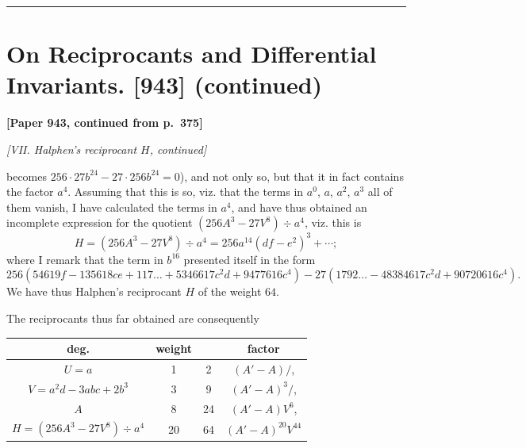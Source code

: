 \documentclass[11pt,a4paper]{book}
\begin{document}
{{{\vspace{1cm}
\begin{center}
\rule{0.5\textwidth}{0.4pt}
\end{center}
\clearpage


\thispagestyle{empty}


\newpage

\section[On Reciprocants and Differential Invariants (continued)]
{On Reciprocants and Differential Invariants. [943] (continued)}

\noindent\textbf{[Paper 943, continued from p.~375]}

\bigskip

\noindent\textit{[VII. Halphen's reciprocant $H$, continued]}

\medskip

becomes $256 \cdot 27b^{24} - 27 \cdot 256b^{24} = 0$), and not only so, but that it in fact contains the factor $a^4$. Assuming that this is so, viz.
that the terms in $a^0$, $a$, $a^2$, $a^3$ all of them vanish, I have calculated the terms in $a^4$, and have thus obtained an incomplete expression for the quotient $(256A^3 - 27V^8) \div a^4$, viz.
this is
\[
H = (256A^3 - 27V^8) \div a^4 = 256a^{14}(df - e^2)^3 + \cdots ;
\]
where I remark that the term in $b^{16}$ presented itself in the form
\[
256(54619f - 135618ce + 117\dots + 5346617c^2d + 9477616c^4) - 27(1792\dots - 48384617c^2d + 90720616c^4).
\]
We have thus Halphen's reciprocant $H$ of the weight $64$.

The reciprocants thus far obtained are consequently
\begin{center}
\begin{tabular}{c|c|c|c}
deg. & weight & & factor \\ \hline
$U = a$ & 1 & 2 & $(A' - A)/$, \\
$V = a^2d - 3abc + 2b^3$ & 3 & 9 & $(A' - A)^3/$, \\
$A$ & 8 & 24 & $(A' - A)V^6$, \\
$H = (256A^3 - 27V^8) \div a^4$ & 20 & 64 & $(A' - A)^{20}V^{44}$
\end{tabular}
\end{center}

}}}
\end{document}
